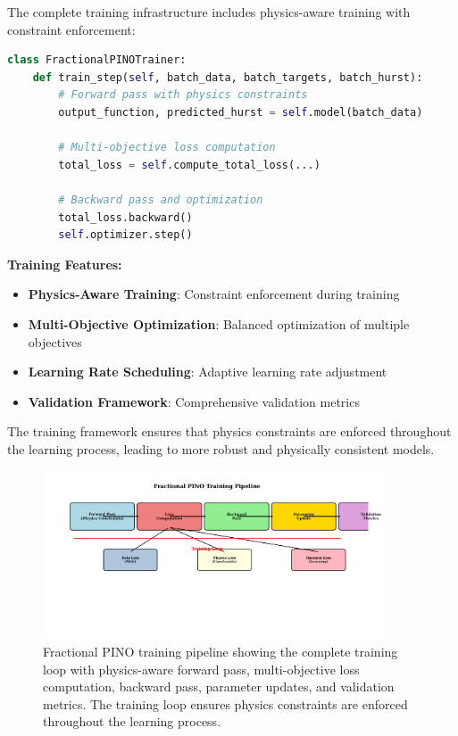 The complete training infrastructure includes physics-aware training with constraint enforcement:

\begin{lstlisting}[language=Python, caption=Training Step Implementation]
class FractionalPINOTrainer:
    def train_step(self, batch_data, batch_targets, batch_hurst):
        # Forward pass with physics constraints
        output_function, predicted_hurst = self.model(batch_data)
        
        # Multi-objective loss computation
        total_loss = self.compute_total_loss(...)
        
        # Backward pass and optimization
        total_loss.backward()
        self.optimizer.step()
\end{lstlisting}

\textbf{Training Features:}
\begin{itemize}
    \item \textbf{Physics-Aware Training}: Constraint enforcement during training
    \item \textbf{Multi-Objective Optimization}: Balanced optimization of multiple objectives
    \item \textbf{Learning Rate Scheduling}: Adaptive learning rate adjustment
    \item \textbf{Validation Framework}: Comprehensive validation metrics
\end{itemize}

The training framework ensures that physics constraints are enforced throughout the learning process, leading to more robust and physically consistent models.

\begin{figure}[h]
\centering
\includegraphics[width=0.9\textwidth]{training_pipeline.png}
\caption{Fractional PINO training pipeline showing the complete training loop with physics-aware forward pass, multi-objective loss computation, backward pass, parameter updates, and validation metrics. The training loop ensures physics constraints are enforced throughout the learning process.}
\label{fig:training_pipeline}
\end{figure}

